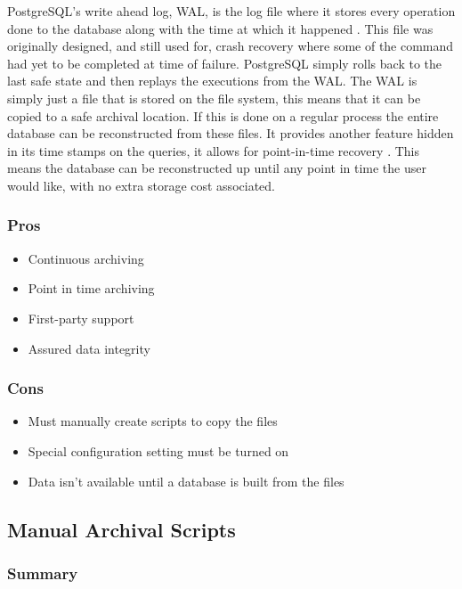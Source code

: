         PostgreSQL's write ahead log, WAL, is the log file where it stores every operation done to the database along with the time at which it happened \cite{postgresql_wal}.  This file was originally designed, and still used for, crash recovery where some of the command had yet to be completed at time of failure.  PostgreSQL simply rolls back to the last safe state and then replays the executions from the WAL.  The WAL is simply just a file that is stored on the file system, this means that it can be copied to a safe archival location.  If this is done on a regular process the entire database can be reconstructed from these files.  It provides another feature hidden in its time stamps on the queries, it allows for point-in-time recovery \cite{postgresql_wal}.  This means the database can be reconstructed up until any point in time the user would like, with no extra storage cost associated.
        
        \subsubsection{Pros}
        \begin{itemize}
            \item Continuous archiving
            \item Point in time archiving
            \item First-party support
            \item Assured data integrity
        \end{itemize}
        
        \subsubsection{Cons}
        \begin{itemize}
            \item Must manually create scripts to copy the files
            \item Special configuration setting must be turned on
            \item Data isn't available until a database is built from the files
        \end{itemize}
    
    \subsection{Manual Archival Scripts}
    
        \subsubsection{Summary}
        
